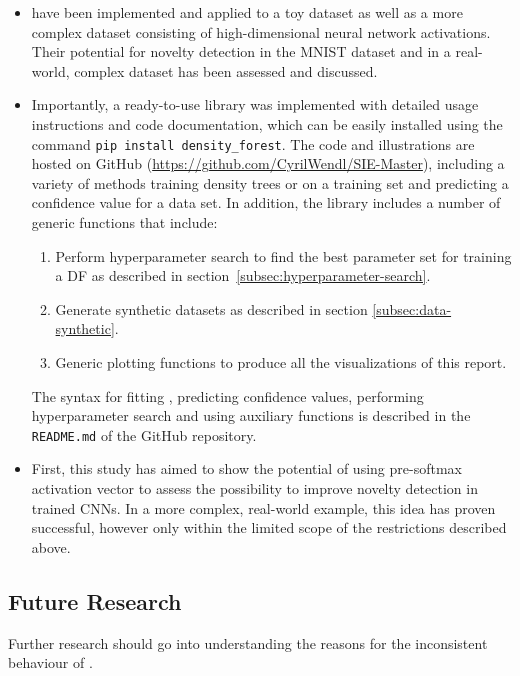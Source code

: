 \documentclass[10pt]{article}
\begin{document}
\begin{itemize}
	\item {} have been implemented and applied to a toy dataset as well as a more complex dataset consisting of high-dimensional neural network activations. Their potential for novelty detection in the \gls{MNIST} dataset and in a real-world, complex dataset has been assessed and discussed.
	\item Importantly, a ready-to-use library was implemented with detailed usage instructions and code documentation, which can be easily installed using the command \texttt{pip install density\_forest}. The code and illustrations are hosted on GitHub (\url{https://github.com/CyrilWendl/SIE-Master}), including a variety of methods training density trees or  on a training set and predicting a confidence value for a data set. In addition, the library includes a number of generic functions that include:
	\begin{enumerate}
		\item Perform hyperparameter search to find the best parameter set for training a \acrlong{DF} as described in section \ref{subsec:hyperparameter-search}.
		\item Generate synthetic datasets as described in section \ref{subsec:data-synthetic}.
		\item Generic plotting functions to produce all the visualizations of this report.
	\end{enumerate}
	The syntax for fitting , predicting confidence values, performing hyperparameter search and using auxiliary functions is described in the \texttt{README.md} of the GitHub repository.
	\item First, this study has aimed to show the potential of using pre-softmax activation vector to assess the possibility to improve novelty detection in trained \glspl{CNN}. In a more complex, real-world example, this idea has proven successful, however only within the limited scope of the restrictions described above.
\end{itemize}

\subsection{Future Research}
Further research should go into understanding the reasons for the inconsistent behaviour of . 

\end{document}
